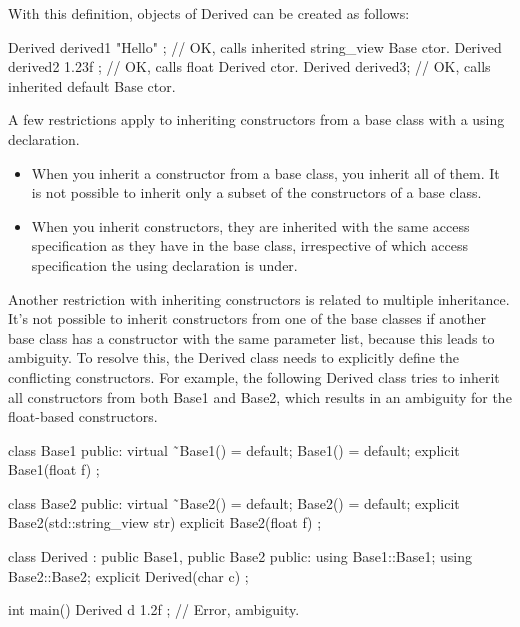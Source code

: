 With this definition, objects of Derived can be created as follows:

\begin{cpp}
Derived derived1 { "Hello" }; // OK, calls inherited string_view Base ctor.
Derived derived2 { 1.23f }; // OK, calls float Derived ctor.
Derived derived3; // OK, calls inherited default Base ctor.
\end{cpp}

A few restrictions apply to inheriting constructors from a base class with a using declaration.

\begin{itemize}
\item
When you inherit a constructor from a base class, you inherit all of them. It is not possible to inherit only a subset of the constructors of a base class.

\item
When you inherit constructors, they are inherited with the same access specification as they have in the base class, irrespective of which access specification the using declaration is under.
\end{itemize}


Another restriction with inheriting constructors is related to multiple inheritance. It’s not possible to inherit constructors from one of the base classes if another base class has a constructor with the same parameter list, because this leads to ambiguity. To resolve this, the Derived class needs to explicitly define the conflicting constructors. For example, the following Derived class tries to inherit all constructors from both Base1 and Base2, which results in an ambiguity for the float-based constructors.

\begin{cpp}
class Base1
{
    public:
        virtual ˜Base1() = default;
        Base1() = default;
        explicit Base1(float f) {}
};

class Base2
{
    public:
        virtual ˜Base2() = default;
        Base2() = default;
        explicit Base2(std::string_view str) {}
        explicit Base2(float f) {}
};

class Derived : public Base1, public Base2
{
    public:
        using Base1::Base1;
        using Base2::Base2;
        explicit Derived(char c) {}
};

int main()
{
    Derived d { 1.2f }; // Error, ambiguity.
}
\end{cpp}

